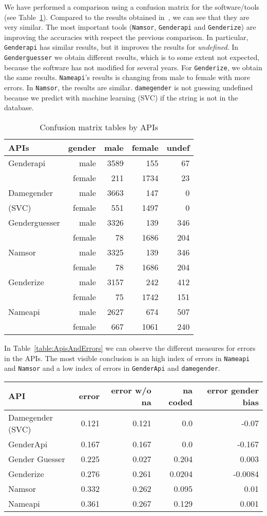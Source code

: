 \documentclass[a4paper]{article}
\begin{document}
We have performed a comparison using a confusion matrix for the software/tools (see Table~\ref{table:ConfusionMatrixTables}).
Compared to the results obtained in~\cite{10.7717/peerj-cs.156}, we can see that they are very similar.
The most important tools (\texttt{Namsor}, \texttt{Genderapi} and \texttt{Genderize}) are improving the accuracies with respect the previous comparison.
In particular, \texttt{Genderapi} has similar results, but it improves the results for \emph{undefined}.
In \texttt{Genderguesser} we obtain different results, which is to some extent not expected, because the software has not modified for several years.
For \texttt{Genderize}, we obtain the same results. 
\texttt{Nameapi}'s results is changing from male to female with more errors. 
In \texttt{Namsor}, the results are similar. 
\texttt{damegender} is not guessing undefined because we predict with machine learning (SVC) if the string is not in the database.

\begin{table}
\footnotesize
\begin{tabular}[]{lrrrr}
  \hline
  APIs          & gender & male & female & undef \tabularnewline
\hline
Genderapi         & male    & 3589 & 155  &  67 \tabularnewline
                  & female  & 211  & 1734 &  23 \tabularnewline
Damegender       & male    & 3663 & 147  &   0 \tabularnewline
(SVC)\footnotemark[1] & female  & 551  & 1497 &   0 \tabularnewline
Genderguesser     & male    & 3326 &  139 & 346 \tabularnewline
                  & female  & 78   & 1686 & 204 \tabularnewline
Namsor            & male    & 3325 & 139  & 346 \tabularnewline
                  & female  & 78   & 1686 & 204 \tabularnewline
Genderize         & male    & 3157 & 242  & 412 \tabularnewline
                  & female  & 75   & 1742 & 151 \tabularnewline
Nameapi           & male    & 2627 & 674  & 507 \tabularnewline
                  & female  & 667  & 1061 & 240 \tabularnewline 
\hline
\end{tabular}
\caption{Confusion matrix tables by APIs}
\label{table:ConfusionMatrixTables}
\end{table}


In Table~\ref{table:ApisAndErrors} we can observe the different measures for errors in the APIs. The most visible conclusion is an high index of errors in \texttt{Nameapi} and \texttt{Namsor} and a low index of errors in \texttt{GenderApi} and \texttt{damegender}.

\begin{table*}
\footnotesize
\begin{tabular}[]{lrrrr}
\hline
API & error & error w/o na & na coded & error gender bias\tabularnewline
\hline
Damegender (SVC)\footnotemark[1] & 0.121 & 0.121 & 0.0 & -0.07\tabularnewline
GenderApi & 0.167 & 0.167 & 0.0 & -0.167\tabularnewline
Gender Guesser & 0.225 & 0.027 & 0.204 & 0.003\tabularnewline
Genderize & 0.276 & 0.261 & 0.0204 & -0.0084 \tabularnewline 
Namsor & 0.332 & 0.262 & 0.095 & 0.01 \tabularnewline
Nameapi & 0.361 & 0.267 & 0.129 & 0.001 \tabularnewline
\hline
\end{tabular}
\caption{APIs and Errors}
\label{table:ApisAndErrors}
\end{table*}
\end{document}
